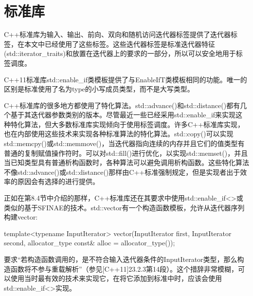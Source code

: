 \section{标准库}
C++标准库为输入、输出、前向、双向和随机访问迭代器标签提供了迭代器标签，在本文中已经使用了这些标签。这些迭代器标签是标准迭代器特征(std::iterator\_traits)和放置在迭代器上的要求的一部分，所以可以安全地用于标签调度。

C++11标准库std::enable\_if类模板提供了与EnableIfT类模板相同的功能。唯一的区别是标准使用了名为type的小写成员类型，而不是大写类型。

C++标准库的很多地方都使用了特化算法。std::advance()和std::distance()都有几个基于其迭代器参数类别的版本。尽管最近一些已经采用std::enable\_if来实现这种特化算法，但大多数标准库实现倾向于使用标签调度。许多C++标准库实现，也在内部使用这些技术来实现各种标准算法的特化算法。std::copy()可以实现std::memcpy()或std::memmove()，当迭代器指向连续的内存并且它们的值类型有普通的复制赋值操作符时。可以对std::fill()进行优化，以实现std::memset()，并且当已知类型具有普通析构函数时，各种算法可以避免调用析构函数。这些特化算法不像std::advance()或std::distance()那样由C++标准强制规定，但是实现者出于效率的原因会有选择的进行提供。

正如在第8.4节中介绍的那样，C++标准库还在其要求中使用std::enable\_if<>或类似的基于SFINAE的技术。std::vector有一个构造函数模板，允许从迭代器序列构建vector:

\begin{cpp}
template<typename InputIterator>
vector(InputIterator first, InputIterator second,
		allocator_type const& alloc = allocator_type());
\end{cpp}

要求“若构造函数调用的，是不符合输入迭代器条件的InputIterator类型，那么构造函数将不参与重载解析”（参见[C++11]23.2.3第14段）。这个措辞非常模糊，可以使用当时最有效的技术来实现它，在将它添加到标准中时，应该会使用std::enable\_if<>实现。

























